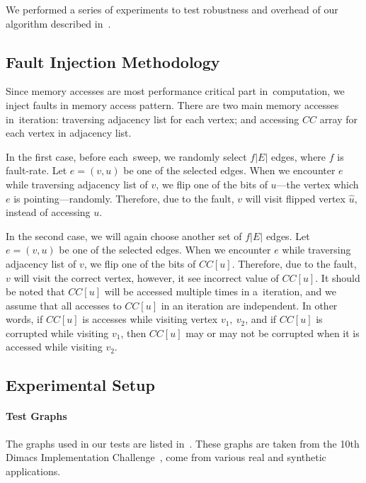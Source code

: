 We performed a series of experiments to test robustness and overhead of our algorithm described in~. 

%
\subsection{Fault Injection Methodology}
Since memory accesses are most performance critical part in~\sv computation, we inject faults in memory access pattern. There are two main memory accesses in~\sv iteration: traversing adjacency list for each vertex; and 
accessing $CC$ array for each vertex in adjacency list. 

In the first case, before each~\sv sweep, we randomly select $f|E|$ edges, where $f$ is fault-rate. Let $e=(v,u)$ be  one of the selected edges. When we encounter $e$ while traversing adjacency list of $v$, we flip one of the bits of $u$---the vertex which $e$ is pointing---randomly. 
Therefore, due to the fault, $v$ will visit flipped vertex $\hat{u}$, instead of accessing $u$. 

In the second case, we will again choose another set of $f|E|$ edges. Let $e=(v,u)$ be  one of the selected edges. When we encounter $e$ while traversing adjacency list of $v$, we flip one of the bits of $CC[u]$.
Therefore, due to the fault, $v$ will visit the correct vertex, however, it see incorrect value of  $CC[u]$.
It should be noted that $CC[u]$ will be accessed multiple times in a~\sv iteration, and we assume that 
all accesses to $CC[u]$ in an iteration are independent. In other words, if $CC[u]$ is accesses while visiting 
vertex $v_{1},\ v_{2}$, and if $CC[u]$ is corrupted while visiting $v_{1}$, then $CC[u]$ may or may not be corrupted when it is accessed while visiting $v_{2}$.


\subsection{Experimental Setup}



\paragraph{Test Graphs}
The graphs used in our tests are listed in~. 
These graphs are taken from the 10th Dimacs Implementation Challenge~\cite{Bader-dimacs-graph2014}, come from various real and synthetic applications. 


